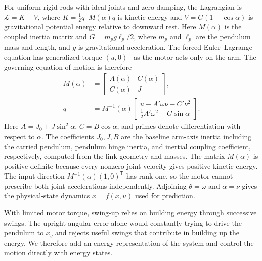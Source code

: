 \documentclass[letterpaper,10pt,conference]{ieeeconf}
\begin{document}
For uniform rigid rods with ideal joints and zero damping, the Lagrangian is $\mathcal L=K-V$, where $K=\tfrac12\dot q^{\mathsf T}M(\alpha)\dot q$ is kinetic energy and $V=G(1-\cos\alpha)$ is gravitational potential energy relative to downward rest. Here $M(\alpha)$ is the coupled inertia matrix and $G=m_p g\ell_p/2$, where $m_p$ and $\ell_p$ are the pendulum mass and length, and $g$ is gravitational acceleration.
The forced Euler--Lagrange equation has generalized torque $(u,0)^{\mathsf T}$ as the motor acts only on the arm. The governing equation of motion is therefore
\begin{equation}
\begin{aligned}
 M(\alpha)&=\begin{bmatrix}A(\alpha)&C(\alpha)\\C(\alpha)&J\end{bmatrix},\\
 \ddot q
 &=M^{-1}(\alpha)
 \begin{bmatrix}
 u-A'\omega\nu-C'\nu^2\\
 \tfrac12 A'\omega^2-G\sin\alpha
 \end{bmatrix}.
\end{aligned}
\label{eq:dynamics}
\end{equation}
Here $A=J_0+J\sin^2\alpha$, $C=B\cos\alpha$, and primes denote differentiation with respect to $\alpha$. The coefficients $J_0,J,B$ are the baseline arm-axis inertia including the carried pendulum, pendulum hinge inertia, and inertial coupling coefficient, respectively, computed from the link geometry and masses. The matrix $M(\alpha)$ is positive definite because every nonzero joint velocity gives positive kinetic energy. The input direction $M^{-1}(\alpha)(1,0)^{\mathsf T}$ has rank one, so the motor cannot prescribe both joint accelerations independently. Adjoining $\dot\theta=\omega$ and $\dot\alpha=\nu$ gives the physical-state dynamics $\dot x=f(x,u)$ used for prediction.

With limited motor torque, swing-up relies on building energy through successive swings. The upright angular error alone would constantly trying to drive the pendulum to $x_g$ and rejects useful swings that contribute in building up the energy. We therefore add an energy representation of the system and control the motion directly with energy states.
\end{document}
